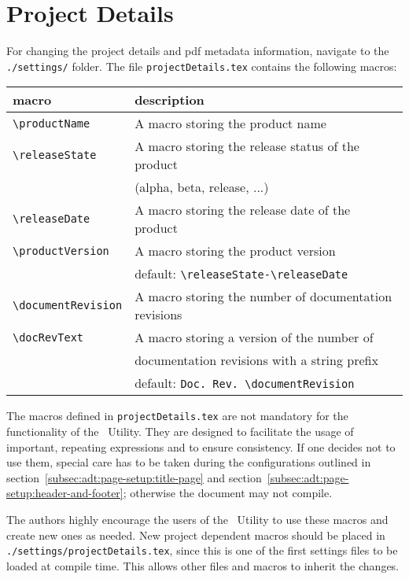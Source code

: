 	\vspace{-2.5cm}
	\section{Project Details}
		\label{sec:adapting-default-theme:project-details}
		For changing the project details and pdf metadata information, navigate to the \lstinline$./settings/$ folder. The file \lstinline$projectDetails.tex$ contains the following macros:
		\lstset{style=LaTeX}
		\begin{longtable}[c]{ll}
			\rowcolor{white}
			\textbf{macro} & \textbf{description}\\
			\midrule
			\endfirsthead
			\rowcolor{tableRowHighlightColor}
			\lstinline$\productName$ & A macro storing the product name\\
			\rowcolor{white}
			\lstinline$\releaseState$ & A macro storing the release status of the product\\ 
			& (alpha, beta, release, ...) \\
			\lstinline$\releaseDate$ & A macro storing the release date of the product\\
			\lstinline$\productVersion$ & A macro storing the product version\\
			\rowcolor{white}
			& default: \lstinline$\releaseState-\releaseDate$\\
			\rowcolor{tableRowHighlightColor}
			\lstinline$\documentRevision$ & A macro storing the number of documentation revisions\\
			\rowcolor{white}
			\lstinline$\docRevText$ & A macro storing a version of the number of\\
			&  documentation revisions with a string prefix\\
			\rowcolor{white}
			& default: \lstinline$Doc. Rev. \documentRevision$\\
			\midrule
		\end{longtable}
		
		\begin{daInfoBox}
			The macros defined in \lstinline$projectDetails.tex$ are not mandatory for the functionality of the \productName~Utility. They are designed to facilitate the usage of important, repeating expressions and to ensure consistency. If one decides not to use them, special care has to be taken during the configurations outlined in \mbox{section \ref{subsec:adt:page-setup:title-page}} and \mbox{section \ref{subsec:adt:page-setup:header-and-footer}}; otherwise the document may not compile.  
		\end{daInfoBox}
		The authors highly encourage the users of the \productName~Utility to use these macros and create new ones as needed. New project dependent macros should be placed in\\ \mbox{\lstinline$./settings/projectDetails.tex$}, since this is one of the first settings files to be loaded at compile time. This allows other files and macros to inherit the changes.
	
